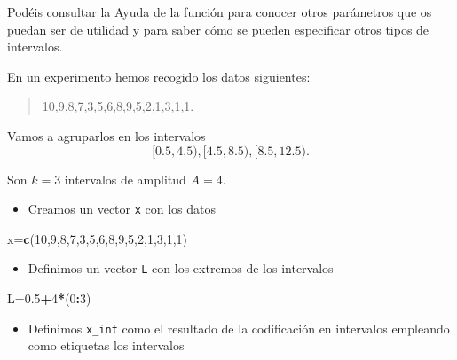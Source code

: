 \documentclass[]{book}
\newenvironment{Shaded}{\begin{snugshade}}{\end{snugshade}}
\newcommand{\DecValTok}[1]{\textcolor[rgb]{0.00,0.00,0.81}{#1}}
\newcommand{\FloatTok}[1]{\textcolor[rgb]{0.00,0.00,0.81}{#1}}
\newcommand{\KeywordTok}[1]{\textcolor[rgb]{0.13,0.29,0.53}{\textbf{#1}}}
\newcommand{\NormalTok}[1]{#1}
\newcommand{\OperatorTok}[1]{\textcolor[rgb]{0.81,0.36,0.00}{\textbf{#1}}}
\providecommand{\tightlist}{%
  \setlength{\itemsep}{0pt}\setlength{\parskip}{0pt}}
\theoremstyle{definition}
\theoremstyle{definition}
\theoremstyle{definition}
\theoremstyle{remark}
\let\BeginKnitrBlock\begin \let\EndKnitrBlock\end
\begin{document}
Podéis consultar la Ayuda de la función para conocer otros parámetros que os puedan ser de utilidad y para saber cómo se pueden especificar otros tipos de intervalos.

\BeginKnitrBlock{example}
\protect\hypertarget{exm:cut}{}{\label{exm:cut} }En un experimento hemos recogido los datos siguientes:
\EndKnitrBlock{example}

\begin{quote}
10,9,8,7,3,5,6,8,9,5,2,1,3,1,1.
\end{quote}

Vamos a agruparlos en los intervalos
\[
[0.5,4.5), [4.5,8.5), [8.5,12.5).
\]

Son \(k=3\) intervalos de amplitud \(A=4\).

\begin{itemize}
\tightlist
\item
  Creamos un vector \texttt{x} con los datos
\end{itemize}

\begin{Shaded}
\begin{Highlighting}[]
\NormalTok{x=}\KeywordTok{c}\NormalTok{(}\DecValTok{10}\NormalTok{,}\DecValTok{9}\NormalTok{,}\DecValTok{8}\NormalTok{,}\DecValTok{7}\NormalTok{,}\DecValTok{3}\NormalTok{,}\DecValTok{5}\NormalTok{,}\DecValTok{6}\NormalTok{,}\DecValTok{8}\NormalTok{,}\DecValTok{9}\NormalTok{,}\DecValTok{5}\NormalTok{,}\DecValTok{2}\NormalTok{,}\DecValTok{1}\NormalTok{,}\DecValTok{3}\NormalTok{,}\DecValTok{1}\NormalTok{,}\DecValTok{1}\NormalTok{)}
\end{Highlighting}
\end{Shaded}

\begin{itemize}
\tightlist
\item
  Definimos un vector \texttt{L} con los extremos de los intervalos
\end{itemize}

\begin{Shaded}
\begin{Highlighting}[]
\NormalTok{L=}\FloatTok{0.5}\OperatorTok{+}\DecValTok{4}\OperatorTok{*}\NormalTok{(}\DecValTok{0}\OperatorTok{:}\DecValTok{3}\NormalTok{)}
\end{Highlighting}
\end{Shaded}

\begin{itemize}
\tightlist
\item
  Definimos \texttt{x\_int} como el resultado de la codificación en intervalos empleando como etiquetas los intervalos
\end{itemize}
\end{document}
